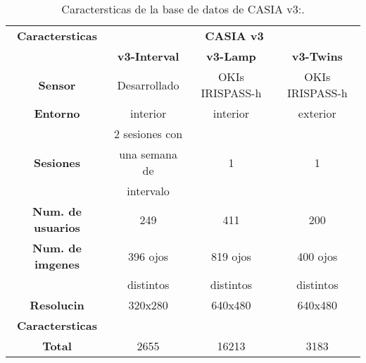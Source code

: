 \begin{table}[h]
    \centering
    \scriptsize
    \begin{tabular}{|c|c|c|c|}
        \hline
        \textbf{Caractersticas}   & \multicolumn{3}{|c|}{\textbf{CASIA v3}}            \\
        \cline{2-4}
                                   & \textbf{v3-Interval}   & \textbf{v3-Lamp}  & \textbf{v3-Twins}         \\
        \hline
        \textbf{Sensor}            & Desarrollado           & OKIs IRISPASS-h  & OKIs IRISPASS-h \\
        \hline
        \textbf{Entorno}           & interior               & interior          & exterior         \\
        \hline
                                   & 2 sesiones con         &                   &           \\
        \textbf{Sesiones}          & una semana de          & 1                 & 1         \\
                                   & intervalo              &                   &           \\
        \hline
        \textbf{Num. de usuarios}  & 249                    & 411               & 200       \\
        \hline
        \textbf{Num. de imgenes}  & 396 ojos               & 819 ojos          & 400 ojos   \\
                                   & distintos              & distintos         & distintos  \\
        \hline
        \textbf{Resolucin}        & 320x280                & 640x480           & 640x480    \\
        \hline
        \textbf{Caractersticas}   &                        &                   &           \\
        \hline
        \textbf{Total}             & 2655                   & 16213             & 3183      \\
        \hline
    \end{tabular}
    \caption{Caractersticas de la base de datos de CASIA v3:\citet{database:CASIA_web}.}
    \label{table:info_CASIAv3}
\end{table}


